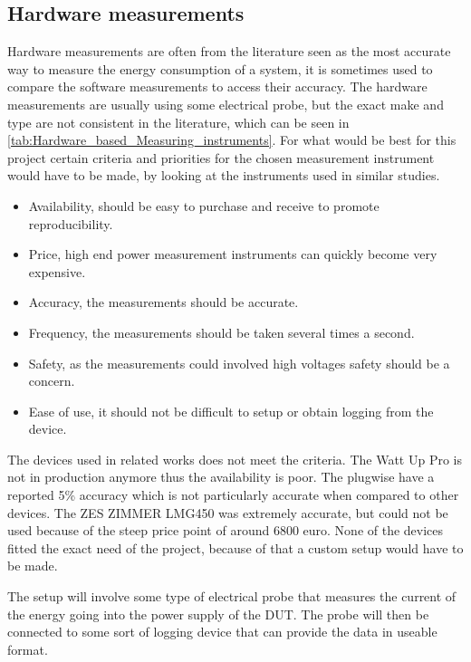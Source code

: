 \subsection{Hardware measurements} \label{sec:clampIntro}
Hardware measurements are often from the literature seen as the most accurate way to measure the energy consumption of a system, it is sometimes used to compare the software measurements to access their accuracy\cite{fahad2019comparative}. The hardware measurements are usually using some electrical probe, but the exact make and type are not consistent in the literature, which can be seen in \cref{tab:Hardware_based_Measuring_instruments}.
For what would be best for this project certain criteria and priorities for the chosen measurement instrument would have to be made, by looking at the instruments used in similar studies.
\begin{itemize}
    \item Availability, should be easy to purchase and receive to promote reproducibility.
    \item Price, high end power measurement instruments can quickly become very expensive.
    \item Accuracy, the measurements should be accurate.
    \item Frequency, the measurements should be taken several times a second.
    \item Safety, as the measurements could involved high voltages safety should be a concern.
    \item Ease of use, it should not be difficult to setup or obtain logging from the device.
\end{itemize}
The devices used in related works does not meet the criteria. The Watt Up Pro is not in production anymore thus the availability is poor. The plugwise have a reported 5\% accuracy which is not particularly accurate when compared to other devices. The ZES ZIMMER LMG450 was extremely accurate, but could not be used because of the steep price point of around 6800 euro. None of the devices fitted the exact need of the project, because of that a custom setup would have to be made. 

The setup will involve some type of electrical probe that measures the current of the energy going into the power supply of the DUT. The probe will then be connected to some sort of logging device that can provide the data in useable format. 

